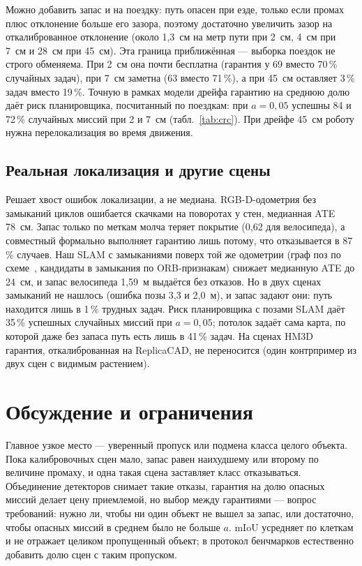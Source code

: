 \documentclass[conference,a4paper]{IEEEtran}
\theoremstyle{definition}
\begin{document}
Можно добавить запас и на поездку: путь опасен при езде, только если промах плюс отклонение больше его зазора, поэтому
достаточно увеличить зазор на откалиброванное отклонение (около 1,3~см на метр пути при 2~см, 4~см при 7~см и 28~см
при 45~см). Эта граница приближённая --- выборка поездок не строго обменяема. При 2~см она почти бесплатна (гарантия у
69 вместо 70\,\% случайных задач), при 7~см заметна (63 вместо 71\,\%), а при 45~см оставляет 3\,\% задач вместо
19\,\%. Точную в рамках модели дрейфа гарантию на среднюю долю даёт риск планировщика, посчитанный по поездкам: при
$a = 0{,}05$ успешны 84 и 72\,\% случайных миссий при 2 и 7~см (табл.~\ref{tab:crc}). При дрейфе 45~см роботу нужна
перелокализация во время движения.

\subsection{Реальная локализация и другие сцены}

Решает хвост ошибок локализации, а не медиана. RGB-D-одометрия без замыканий циклов ошибается скачками на поворотах у
стен, медианная ATE 78~см. Запас только по меткам молча теряет покрытие (0,62 для велосипеда), а совместный формально
выполняет гарантию лишь потому, что отказывается в 87\,\% случаев. Наш SLAM с замыканиями поверх той же одометрии (граф
поз по схеме~\cite{choi2015}, кандидаты в замыкания по ORB-признакам) снижает медианную ATE до 24~см, и запас
велосипеда 1,59~м выдаётся без отказов. Но в двух сценах замыканий не нашлось (ошибка позы 3,3 и 2,0~м), и запас задают
они: путь находится лишь в 1\,\% трудных задач. Риск планировщика с позами SLAM даёт 35\,\% успешных случайных миссий
при $a = 0{,}05$; потолок задаёт сама карта, по которой даже без запаса путь есть лишь в 41\,\% задач. На сценах
HM3D~\cite{hm3d} гарантия, откалиброванная на ReplicaCAD, не переносится (один контрпример из двух сцен с видимым
растением).

\section{Обсуждение и ограничения}

Главное узкое место --- уверенный пропуск или подмена класса целого объекта. Пока калибровочных сцен мало, запас равен
наихудшему или второму по величине промаху, и одна такая сцена заставляет класс отказываться. Объединение детекторов
снимает такие отказы, гарантия на долю опасных миссий делает цену приемлемой, но выбор между гарантиями --- вопрос
требований: нужно ли, чтобы ни один объект не вышел за запас, или достаточно, чтобы опасных миссий в среднем было не
больше $a$. mIoU усредняет по клеткам
и не отражает целиком пропущенный объект; в протокол бенчмарков естественно добавить долю сцен с таким пропуском.
\end{document}
